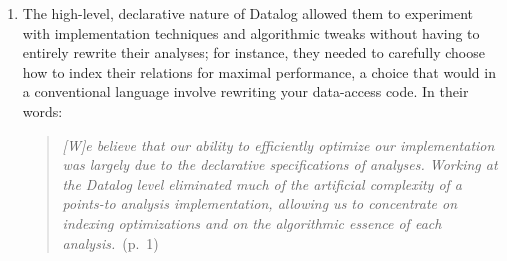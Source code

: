 \begin{enumerate}

\item The high-level, declarative nature of Datalog allowed them to experiment
  with implementation techniques and algorithmic tweaks without having to
  entirely rewrite their analyses; for instance, they needed to carefully choose
  how to index their relations for maximal performance, a choice that would in a
  conventional language involve rewriting your data-access code.
%
  In their words:
  \begin{quote}
    \emph{[W]e believe that our ability to efficiently optimize our
      implementation was largely due to the declarative specifications of
      analyses. Working at the Datalog level eliminated much of the artificial
      complexity of a points-to analysis implementation, allowing us to
      concentrate on indexing optimizations and on the algorithmic essence of
      each analysis.}~(p.~1)
  \end{quote}
  



\end{enumerate}
